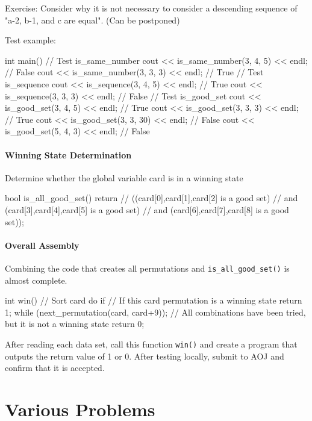 Exercise: Consider why it is not necessary to consider a descending sequence of "a-2, b-1, and c are equal". (Can be postponed)

Test example:

\begin{cbox}
int main() {
  // Test is\_same\_number
  cout << is\_same\_number(3, 4, 5) << endl; // False
  cout << is\_same\_number(3, 3, 3) << endl; // True
  // Test is\_sequence
  cout << is\_sequence(3, 4, 5) << endl; // True
  cout << is\_sequence(3, 3, 3) << endl; // False
  // Test is\_good\_set
  cout << is\_good\_set(3, 4, 5) << endl;  // True
  cout << is\_good\_set(3, 3, 3) << endl;  // True
  cout << is\_good\_set(3, 3, 30) << endl; // False
  cout << is\_good\_set(5, 4, 3) << endl;  // False
}
\end{cbox}

\paragraph{Winning State Determination}

Determine whether the global variable card is in a winning state

\begin{cbox}
bool is_all_good_set() {
    return // ((card[0],card[1],card[2] is a good set)
           // and (card[3],card[4],card[5] is a good set)
           // and (card[6],card[7],card[8] is a good set));
}
\end{cbox}


\paragraph{Overall Assembly}

Combining the code that creates all permutations and \texttt{is\_all\_good\_set()}
is almost complete.

\begin{cbox}
int win() {
    // Sort card
    do {
       if // If this card permutation is a winning state
         return 1;
    } while (next_permutation(card, card+9));
    // All combinations have been tried, but it is not a winning state
    return 0; 
}
\end{cbox}

After reading each data set, call this function \texttt{win()} and create a program that outputs the return value of 1 or 0.
After testing locally, submit to AOJ and confirm that it is accepted.
\section{Various Problems}

